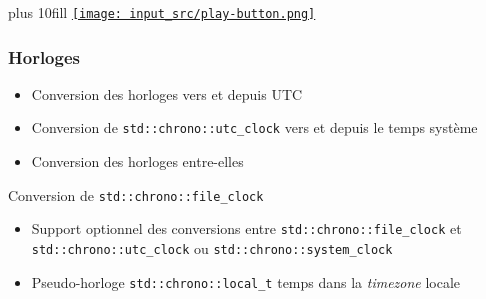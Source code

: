 \documentclass[C++.tex]{subfiles}
\begin{document}
\begin{frame}[fragile]
	\vskip 10mm plus 10fill
	\hfill
	\href{https://godbolt.org/#g:!((g:!((g:!((h:codeEditor,i:(filename:'1',fontScale:14,fontUsePx:'0',j:1,lang:c%2B%2B,selection:(endColumn:1,endLineNumber:12,positionColumn:1,positionLineNumber:12,selectionStartColumn:1,selectionStartLineNumber:1,startColumn:1,startLineNumber:1),source:'%23include+%3Ciostream%3E%0A%23include+%3Cchrono%3E%0A%23include+%3Cformat%3E%0A%0Aint+main()%0A%7B%0A++std::cout+%3C%3C+std::format(%22%7B:%25F+%25T%7D%22,+std::chrono::utc_clock::now())+%3C%3C+%22%5Cn%22%3B%0A++std::cout+%3C%3C+std::format(%22%7B:%25F+%25T%7D%22,+std::chrono::gps_clock::now())+%3C%3C+%22%5Cn%22%3B%0A++std::cout+%3C%3C+std::format(%22%7B:%25F+%25T%7D%22,+std::chrono::tai_clock::now())+%3C%3C+%22%5Cn%22%3B%0A++std::cout+%3C%3C+std::format(%22%7B:%25F+%25T%7D%22,+std::chrono::file_clock::now())+%3C%3C+%22%5Cn%22%3B%0A%7D%0A'),l:'5',n:'0',o:'C%2B%2B+source+%231',t:'0')),k:50,l:'4',n:'0',o:'',s:0,t:'0'),(g:!((h:executor,i:(argsPanelShown:'1',compilationPanelShown:'0',compiler:gsnapshot,compilerName:'',compilerOutShown:'0',execArgs:'',execStdin:'',fontScale:14,fontUsePx:'0',j:1,lang:c%2B%2B,libs:!((name:boost,ver:'175')),options:'-std%3Dc%2B%2B20+-Wall+-Wextra+-pedantic',source:1,stdinPanelShown:'1',tree:'1',wrap:'0'),l:'5',n:'0',o:'Executor+x86-64+gcc+(trunk)+(C%2B%2B,+Editor+%231)',t:'0')),header:(),k:50,l:'4',n:'0',o:'',s:0,t:'0')),l:'2',n:'0',o:'',t:'0')),version:4}{\texttt{[image: input\_src/play-button.png]}}
\end{frame}

\begin{frame}[fragile]
	\frametitle{Horloges}
	\begin{itemize}
		\item Conversion des horloges vers et depuis UTC
		\item Conversion de \lstinline|std::chrono::utc_clock| vers et depuis le temps système
		\item Conversion des horloges entre-elles

	\end{itemize}

	\begin{alertblock}{Conversion de \lstinline|std::chrono::file_clock|}
		\begin{itemize}
			\item Support optionnel des conversions entre \lstinline|std::chrono::file_clock| et \lstinline|std::chrono::utc_clock| ou \lstinline|std::chrono::system_clock|
		\end{itemize}
	\end{alertblock}

	\begin{itemize}
		\item Pseudo-horloge \lstinline|std::chrono::local_t| temps dans la \textit{timezone} locale
	\end{itemize}
\end{frame}
\end{document}
